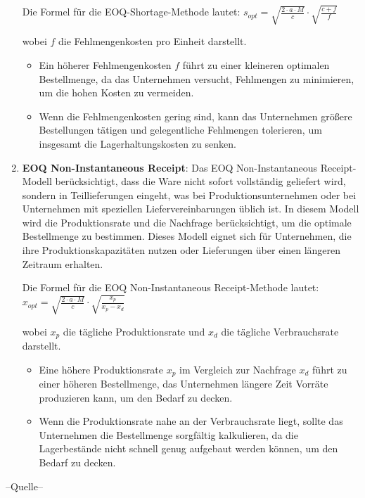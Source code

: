 \documentclass[a4paper,12pt]{article}
\begin{document}
\begin{enumerate}
    Die Formel für die EOQ-Shortage-Methode lautet:
    $s_{opt} = \sqrt{\frac{2 \cdot a \cdot M}{c}} \cdot \sqrt{\frac{c + f}{f}}$

    wobei $f$ die Fehlmengenkosten pro Einheit darstellt. 
    \begin{itemize}
        \item Ein höherer Fehlmengenkosten $f$ führt zu einer kleineren optimalen Bestellmenge, da das Unternehmen versucht, Fehlmengen zu minimieren, um die hohen Kosten zu vermeiden.
        \item Wenn die Fehlmengenkosten gering sind, kann das Unternehmen größere Bestellungen tätigen und gelegentliche Fehlmengen tolerieren, um insgesamt die Lagerhaltungskosten zu senken.
    \end{itemize}


    \item \textbf{EOQ Non-Instantaneous Receipt}:\newline
    Das EOQ Non-Instantaneous Receipt-Modell berücksichtigt, dass die Ware nicht sofort vollständig geliefert wird,
    sondern in Teillieferungen eingeht, was bei Produktionsunternehmen oder bei Unternehmen mit speziellen Liefervereinbarungen üblich ist.
    In diesem Modell wird die Produktionsrate und die Nachfrage berücksichtigt, um die optimale Bestellmenge zu bestimmen. 
    Dieses Modell eignet sich für Unternehmen, die ihre Produktionskapazitäten nutzen oder Lieferungen über einen längeren Zeitraum erhalten.

    Die Formel für die EOQ Non-Instantaneous Receipt-Methode lautet:
    $x_{opt} = \sqrt{\frac{2 \cdot a \cdot M}{c}} \cdot \sqrt{\frac{x_p}{x_p - x_d}}$

    wobei $x_p$ die tägliche Produktionsrate und $x_d$ die tägliche Verbrauchsrate darstellt.
    \begin{itemize}
        \item Eine höhere Produktionsrate $x_p$ im Vergleich zur Nachfrage $x_d$ führt zu einer höheren Bestellmenge,
        das Unternehmen längere Zeit Vorräte produzieren kann, um den Bedarf zu decken.
        \item Wenn die Produktionsrate nahe an der Verbrauchsrate liegt,
        sollte das Unternehmen die Bestellmenge sorgfältig kalkulieren, da die Lagerbestände nicht schnell genug aufgebaut werden können,
        um den Bedarf zu decken.
    \end{itemize}

\end{enumerate}
--Quelle--
\end{document}
